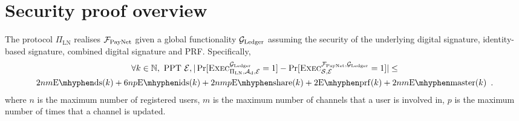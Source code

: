 \section{Security proof overview}
  \begin{theorem}
The protocol $\Pi_{\mathrm{LN}}$ realises $\mathcal{F}_{\mathrm{PayNet}}$
given a global functionality $\mathcal{G}_{\mathrm{Ledger}}$
assuming the security of the underlying digital signature, identity-based signature, 
combined digital signature and PRF. Specifically, 
    \label{theorem:simulation}
    \begin{gather*}
      \forall k \in \mathbb{N}, \text{ PPT } \environment, 
      |\Pr[\textsc{Exec}^{\ledger}_{\Pi_{\mathrm{LN}}, \adversary_{\mathrm{d}},
      \environment} = 1] - \Pr[\textsc{Exec}^{\fpaynet, \ledger}_{\simulator,
      \environment} = 1]| \leq \\
      2nm  \mathrm{E \mhyphen ds}(k)  + 6np  \mathrm{E \mhyphen ids}(k) +
      2nmp  \mathrm{E \mhyphen share}(k) + 2 \mathrm{E \mhyphen
      prf}(k) + 2nm \mathrm{E \mhyphen master}(k) \enspace.
    \end{gather*}
    where $n$ is the maximum number of registered users, 
    $m$ is the maximum number of channels that a user is involved in,
    $p$ is the maximum number of times that a channel is updated. 
  \end{theorem}

